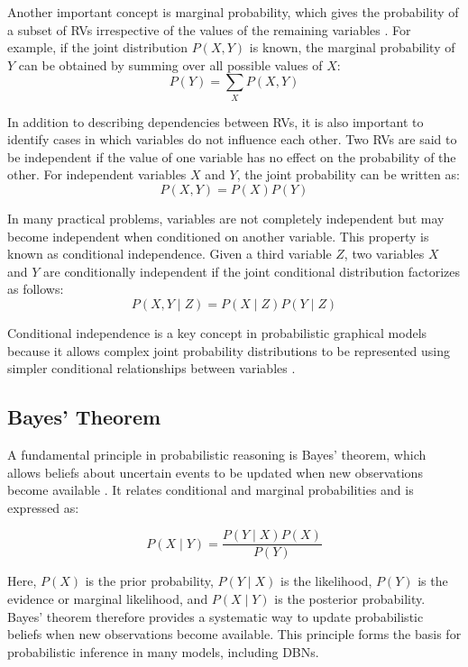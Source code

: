 \par Another important concept is marginal probability, which gives the probability of a subset of \acp{RV} irrespective of the values of the remaining variables \cite{pml1Book}. 
For example, if the joint distribution $P(X,Y)$ is known, the marginal probability of $Y$ can be obtained by summing over all possible values of $X$:
\[
P(Y) = \sum_X P(X,Y)
\]

\par In addition to describing dependencies between \acp{RV}, it is also important to identify cases in which variables do not influence each other. 
Two \acp{RV} are said to be independent if the value of one variable has no effect on the probability of the other. For independent variables $X$ and $Y$, 
the joint probability can be written as:
\[
P(X,Y) = P(X)P(Y)
\]

\par In many practical problems, variables are not completely independent but may become independent when conditioned on another variable. This property is 
known as conditional independence. Given a third variable $Z$, two variables $X$ and $Y$ are conditionally independent if the joint conditional distribution factorizes as follows:
\[
P(X,Y \mid Z) = P(X \mid Z)P(Y \mid Z)
\]

Conditional independence is a key concept in probabilistic graphical models because it allows complex joint probability distributions to be represented using simpler 
conditional relationships between variables \cite{koller2009probabilistic}.

\subsection{Bayes' Theorem}
\label{sec:bayes_theorem}

A fundamental principle in probabilistic reasoning is Bayes' theorem, which allows beliefs about uncertain events to be updated when new observations become available \cite{pml1Book}. 
It relates conditional and marginal probabilities and is expressed as:

\begin{equation}
P(X \mid Y) = \frac{P(Y \mid X) P(X)}{P(Y)}
\label{eq:bayes}
\end{equation}

\par Here, $P(X)$ is the prior probability, $P(Y \mid X)$ is the likelihood, $P(Y)$ is the evidence or marginal likelihood, 
and  $P(X \mid Y)$ is the posterior probability. 
Bayes' theorem therefore provides a systematic way to update probabilistic beliefs when new observations become available.
This principle forms the basis for probabilistic inference in many models, including \acp{DBN}.

